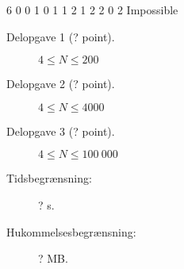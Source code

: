 \documentclass{boi2014-dk}
\begin{document}
	\example
	{
		6
		0 0
		1 0
		1 1
		2 1
		2 2
		0 2
	}
	{
		Impossible
	}

    \Scoring

    \begin{description}
        \item[Delopgave 1 (? point).] $4 \le N \le 200$
        \item[Delopgave 2 (? point).] $4 \le N \le 4000$
        \item[Delopgave 3 (? point).] $4 \le N \le 100\ 000$
    \end{description}

    \Constraints

    \begin{description}
        \item[Tidsbegrænsning:] ? s.
        \item[Hukommelsesbegrænsning:] ? MB.
    \end{description}
\end{document}
